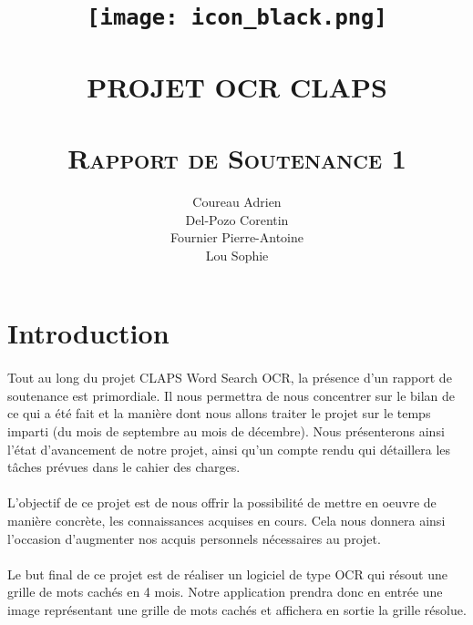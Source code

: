 \documentclass{article}
\begin{document}
\title{ \HUGE \textbf{ \texttt{[image: icon\_black.png]}}
		\\ [2.0cm]
		\Xhline{2pt} \\
        [0.5cm]
		\LARGE \uppercase{Projet OCR CLAPS}\\
        [0.5cm]
		\Xhline{2pt} \\ 
        [4cm]
		\textsc{Rapport de Soutenance 1}}
  
\author{
    Coureau Adrien\\
    Del-Pozo Corentin\\
    Fournier Pierre-Antoine\\
    Lou Sophie\\
}
\date{}
\maketitle
\newpage
\large
\pagestyle{fancy}
\cfoot{\thepage}
\tableofcontents
\pagebreak

\lhead{}

\renewcommand{\headrulewidth}{1pt}
\renewcommand{\footrulewidth}{1pt}
\section{Introduction}
\paragraph{}
Tout au long du projet CLAPS Word Search OCR, la présence d’un rapport de soutenance est primordiale. Il nous permettra de nous concentrer sur le bilan de ce qui a été fait et la manière dont nous allons traiter le projet sur le temps imparti (du mois de septembre au mois de décembre).
Nous présenterons ainsi l’état d’avancement de notre projet, ainsi qu’un compte rendu qui détaillera les tâches prévues dans le cahier des charges.
\paragraph{}
L’objectif de ce projet est de nous offrir la possibilité de mettre en oeuvre de manière concrète, les connaissances acquises en cours. Cela nous donnera ainsi l’occasion d’augmenter nos acquis personnels nécessaires au projet.
\paragraph{}
Le but final de ce projet est de réaliser un logiciel de type OCR qui résout une grille de mots cachés en 4 mois. Notre application prendra donc en entrée une image représentant une grille de mots cachés et affichera en sortie la grille résolue.
\end{document}

